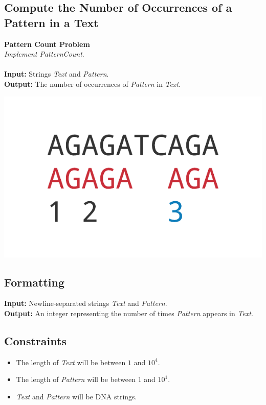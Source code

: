 \documentclass{article}
\begin{document}
\subsection{Compute the Number of Occurrences of a Pattern in a Text}
\hline\vspace{5}
\noindent \textbf{Pattern Count Problem}\\
\emph{Implement PatternCount}.\\ \\
\textbf{Input:} Strings \emph{Text} and \emph{Pattern}.\\
\textbf{Output:} The number of occurrences of \emph{Pattern} in \emph{Text}.
\begin{center}
    \includegraphics[scale=0.24]{c1/logos/1A.png} 
\end{center}
\hline\vspace{5}

\subsection*{Formatting}
\textbf{Input:} Newline-separated strings \emph{Text} and \emph{Pattern}.\\
\noindent \textbf{Output:} An integer representing the number of times \emph{Pattern} appears in \emph{Text}.

\subsection*{Constraints}
\begin{itemize}
    \item The length of \emph{Text} will be between $1$ and $10^4$.
    \item The length of \emph{Pattern} will be between $1$ and $10^1$.
    \item \emph{Text} and \emph{Pattern} will be DNA strings.
\end{itemize}
\pagebreak
\end{document}
